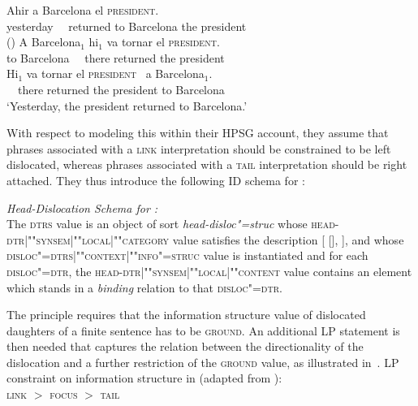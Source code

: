\documentclass[output=paper,biblatex,babelshorthands,newtxmath,draftmode,colorlinks,citecolor=brown]{langscibook}
\begin{document}
\begin{exe}
  \ex\label{ex:catalan}
  \begin{xlist}
    \ex\gll Ahir  a Barcelona el \textsc{president}\RF.\\
         yesterday \ \ returned to Barcelona the president\\\hfill()
   \ex\gll  A Barcelona$_1$ \LF hi$_1$ {va tornar} el \textsc{president}\RF.\\
           to Barcelona \ \  there returned the president\\\label{ex:catalan-a}
           \ex\gll \LF Hi$_1$ {va tornar} el \textsc{president}\RF\ {} a Barcelona$_1$.\\
            \ \  there  returned the president to Barcelona\\\label{ex:catalan-b}
\trans `Yesterday, the president returned to Barcelona.'
  \end{xlist}
\end{exe}
 
\noindent
With respect to modeling this within their HPSG account, they assume
that phrases associated with a \textsc{link} interpretation should be
constrained to be left dislocated, whereas phrases associated with a
\textsc{tail} interpretation should be right attached.
They thus introduce the following ID schema for :
\begin{sloppy}
\begin{exe}
\ex  \textit{Head-Dislocation Schema for :}\\
  The \textsc{dtrs} value is an object of sort
  \textit{head-disloc"=struc} whose
  \textsc{head-dtr|""syn\-sem|""local|""category} value satisfies the
  description
  {}[\head {} [\vform\linebreak {}], \subcat \eliste ], and whose
  \textsc{disloc"=dtrs|""context|""info"=struc} value is instantiated and
  for each \textsc{disloc"=dtr}, the
  \textsc{head-dtr|""syn\-sem|""local|""content} value contains an element
  which stands in a \textit{binding} relation to that
  \textsc{disloc"=dtr}.
\end{exe}
\end{sloppy}

\largerpage
\noindent
The principle requires that the information structure value of
dislocated daughters of a finite sentence has to be
\textsc{ground}. An additional LP statement is then needed that captures the relation
between the directionality of the dislocation and a further
restriction of the \textsc{ground} value, as illustrated in~.
\ea
LP constraint on information structure in  (adapted from \citealp[]{EV96a}):\\
  \centering
  \textsc{link} $>$ \textsc{focus} $>$ \textsc{tail}
\end{document}
